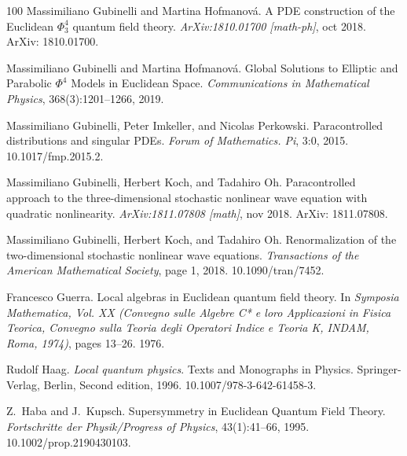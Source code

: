 \documentclass{article}
\newcommand{\tmtextit}[1]{{\itshape{#1}}}
\begin{document}
\begin{thebibliography}{100}
  Massimiliano Gubinelli  and  Martina
  Hofmanov{\'a}. {\newblock}A PDE construction of the Euclidean $\Phi^4_3$
  quantum field theory. {\newblock}\tmtextit{ArXiv:1810.01700 [math-ph]}, oct
  2018. {\newblock}ArXiv: 1810.01700.{\newblock}
  
  Massimiliano Gubinelli  and  Martina
  Hofmanov{\'a}. {\newblock}Global Solutions to Elliptic and Parabolic
  $\Phi^4$ Models in Euclidean Space. {\newblock}\tmtextit{Communications in
  Mathematical Physics}, 368(3):1201--1266, 2019.{\newblock}
  
  Massimiliano Gubinelli, Peter
  Imkeller, and  Nicolas Perkowski. {\newblock}Paracontrolled distributions
  and singular PDEs. {\newblock}\tmtextit{Forum of Mathematics. Pi}, 3:0,
  2015.
  {\newblock}\href{Https://doi.org/10.1017/fmp.2015.2}{}10.1017/fmp.2015.2.{\newblock}
  
  Massimiliano Gubinelli, Herbert
  Koch, and  Tadahiro Oh. {\newblock}Paracontrolled approach to the
  three-dimensional stochastic nonlinear wave equation with quadratic
  nonlinearity. {\newblock}\tmtextit{ArXiv:1811.07808 [math]}, nov 2018.
  {\newblock}ArXiv: 1811.07808.{\newblock}
  
  Massimiliano Gubinelli, Herbert
  Koch, and  Tadahiro Oh. {\newblock}Renormalization of the two-dimensional
  stochastic nonlinear wave equations. {\newblock}\tmtextit{Transactions of
  the American Mathematical Society},  page  1, 2018.
  {\newblock}\href{Https://doi.org/10.1090/tran/7452}{}10.1090/tran/7452.{\newblock}
  
  Francesco Guerra. {\newblock}Local algebras in
  Euclidean quantum field theory. {\newblock}In \tmtextit{Symposia
  Mathematica, Vol. XX (Convegno sulle Algebre C* e loro Applicazioni in
  Fisica Teorica, Convegno sulla Teoria degli Operatori Indice e Teoria K,
  INDAM, Roma, 1974)},  pages  13--26. 1976.{\newblock}
  
  Rudolf Haag. {\newblock}\tmtextit{Local quantum physics}.
  {\newblock}Texts and Monographs in Physics. Springer-Verlag, Berlin, Second 
  edition, 1996.
  {\newblock}\href{Https://doi.org/10.1007/978-3-642-61458-3}{}10.1007/978-3-642-61458-3.{\newblock}
  
  Z.~Haba  and  J.~Kupsch.
  {\newblock}Supersymmetry in Euclidean Quantum Field Theory.
  {\newblock}\tmtextit{Fortschritte der Physik/Progress of Physics},
  43(1):41--66, 1995.
  {\newblock}\href{Https://doi.org/10.1002/prop.2190430103}{}10.1002/prop.2190430103.{\newblock}
  

\end{thebibliography}
\end{document}
